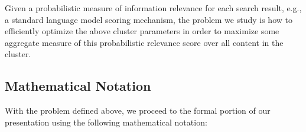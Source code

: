 Given a probabilistic measure of information relevance for each search result, e.g., a standard language model scoring mechanism, 
the problem we study is how to efficiently optimize the above cluster parameters in order to maximize some aggregate measure of this probabilistic relevance score over all content in the cluster. 


\subsection{Mathematical Notation}

With the problem defined above, we proceed to the formal portion of our presentation using  
the following mathematical notation:

